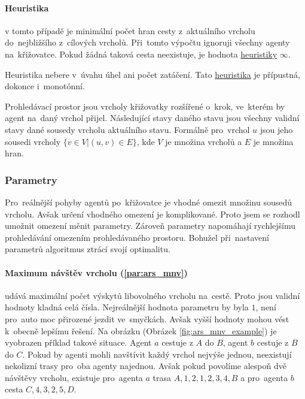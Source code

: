 \paragraph{Heuristika}\label{par:ars_heuristika} v tomto případě je minimální počet hran cesty
z~aktuálního vrcholu do~nejbližšího z~cílových vrcholů.
Při~tomto výpočtu ignoruji všechny agenty na~křižovatce.
Pokud žádná taková cesta neexistuje, je hodnota \hyperref[par:ars_heuristika]{heuristiky} $\infty$.

Heuristika nebere v~úvahu úhel ani počet zatáčení.
Tato \hyperref[par:ars_heuristika]{heuristika} je přípustná, dokonce i~monotónní.

Prohledávací prostor jsou vrcholy křižovatky rozšířené o~krok, ve~kterém by agent na~daný vrchol přijel.
Následující stavy daného stavu jsou všechny validní stavy dané sousedy vrcholu aktuálního stavu.
Formálně pro~vrchol $u$ jsou jeho sousedi vrcholy $\{v \in V | (u,v)\in E\}$,
kde $V$ je množina vrcholů a $E$ je množina hran.

\subsubsection{Parametry}\label{subsubsec:ars_parametry}
Pro~reálnější pohyby agentů po~křižovatce je vhodné omezit množinu sousedů vrcholu.
Avšak určení vhodného omezení je komplikované.
Proto jsem se rozhodl umožnit omezení měnit parametry.
Zároveň parametry napomáhají rychlejšímu prohledávání omezením prohledávaného prostoru.
Bohužel při~nastavení parametrů algoritmus ztrácí svojí optimalitu.

\paragraph{Maximum návštěv vrcholu (\ref{par:ars_mnv})}
udává maximální počet výskytů libovolného vrcholu na~cestě.
Proto jsou validní hodnoty kladná celá čísla.
Nejreálnější hodnota parametru by byla $1$, není pro~auto moc přirozené jezdit ve~smyčkách.
Avšak vyšší hodnoty mohou vést k~obecně lepšímu řešení.
Na obrázku (Obrázek \ref{fig:ars_mnv_example}) je vyobrazen příklad takové situace.
Agent $a$ cestuje z $A$ do $B$, agent $b$ cestuje z $B$ do $C$.
Pokud by agenti mohli navštívit každý vrchol nejvýše jednou, neexistují nekolizní trasy pro~oba agenty najednou.
Avšak pokud povolíme alespoň dvě návštěvy vrcholu, existuje pro~agenta $a$ trasa $A, 1, 2, 1, 2, 3, 4, B$
a pro~agenta $b$ cesta $C, 4, 3, 2, 5, D$.

